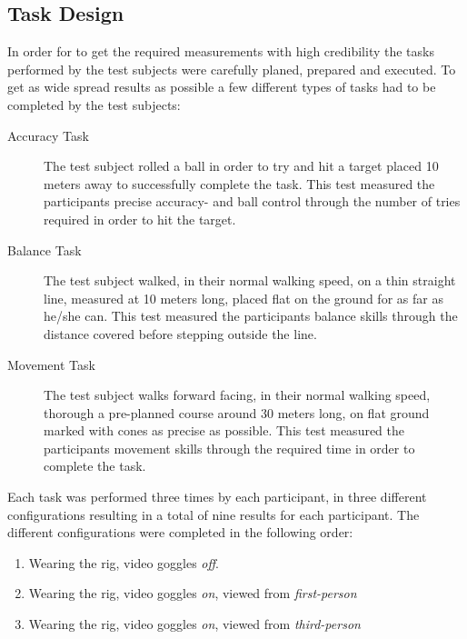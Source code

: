 \documentclass[runningheads,a4paper,oribibl]{llncs}
\begin{document}
\subsection{Task Design}
In order for to get the required measurements with high credibility the tasks performed by the test subjects were carefully planed, prepared and executed. To get as wide spread results as possible a few different types of tasks had to be completed by the test subjects:
\begin{description}
   \item[Accuracy Task] The test subject rolled a ball in order to try and hit a target placed 10 meters away to successfully complete the task. This test measured the participants precise accuracy- and ball control through the number of tries required in order to hit the target.
   \item[Balance Task] The test subject walked, in their normal walking speed, on a thin straight line, measured at 10 meters long, placed flat on the ground for as far as he/she can. This test measured the participants balance skills through the distance covered before stepping outside the line.
   \item[Movement Task] The test subject walks forward facing, in their normal walking speed, thorough a pre-planned course around 30 meters long, on flat ground marked with cones as precise as possible. This test measured the participants movement skills through the required time in order to complete the task.
\end{description}

Each task was performed three times by each participant, in three different configurations resulting in a total of nine results for each participant. The different configurations were completed in the following order:
\begin{enumerate}
	\item Wearing the rig, video goggles \emph{off}.
	\item Wearing the rig, video goggles \emph{on}, viewed from \emph{first-person}
	\item Wearing the rig, video goggles \emph{on}, viewed from \emph{third-person}
\end{enumerate}
\end{document}
